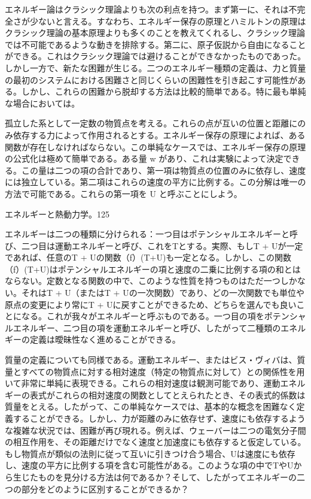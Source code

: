 \documentclass[a4paper,11pt,openany]{ltjsbook}
\begin{document}
エネルギー論はクラシック理論よりも次の利点を持つ。まず第一に、それは不完全さが少ないと言える。すなわち、エネルギー保存の原理とハミルトンの原理はクラシック理論の基本原理よりも多くのことを教えてくれるし、クラシック理論では不可能であるような動きを排除する。第二に、原子仮説から自由になることができる。これはクラシック理論では避けることができなかったものであった。しかし一方で、新たな困難が生じる。二つのエネルギー種類の定義は、力と質量の最初のシステムにおける困難さと同じくらいの困難性を引き起こす可能性がある。しかし、これらの困難から脱却する方法は比較的簡単である。特に最も単純な場合においては。

孤立した系として一定数の物質点を考える。これらの点が互いの位置と距離にのみ依存する力によって作用されるとする。エネルギー保存の原理によれば、ある関数が存在しなければならない。この単純なケースでは、エネルギー保存の原理の公式化は極めて簡単である。ある量 w があり、これは実験によって決定できる。この量は二つの項の合計であり、第一項は物質点の位置のみに依存し、速度には独立している。第二項はこれらの速度の平方に比例する。この分解は唯一の方法で可能である。これらの第一項を U と呼ぶことにしよう。

エネルギーと熱動力学。125

エネルギーは二つの種類に分けられる：一つ目はポテンシャルエネルギーと呼び、二つ目は運動エネルギーと呼び、これをTとする。実際、もしT + Uが一定であれば、任意のT + Uの関数（f）(T+U)も一定となる。しかし、この関数（f）(T+U)はポテンシャルエネルギーの項と速度の二乗に比例する項の和とはならない。定数となる関数の中で、このような性質を持つものはただ一つしかない。それはT + U（またはT + Uの一次関数）であり、どの一次関数でも単位や原点の変更により常にT + Uに戻すことができるため、どちらを選んでも良いことになる。これが我々がエネルギーと呼ぶものである。一つ目の項をポテンシャルエネルギー、二つ目の項を運動エネルギーと呼び、したがって二種類のエネルギーの定義は曖昧性なく進めることができる。

質量の定義についても同様である。運動エネルギー、またはビス・ヴィバは、質量とすべての物質点に対する相対速度（特定の物質点に対して）との関係性を用いて非常に単純に表現できる。これらの相対速度は観測可能であり、運動エネルギーの表式がこれらの相対速度の関数としてとえられたとき、その表式的係数は質量をとえる。したがって、この単純なケースでは、基本的な概念を困難なく定義することができる。しかし、力が距離のみに依存せず、速度にも依存するような複雑な状況では、困難が再び現れる。例えば、ウェーバーは二つの電気分子間の相互作用を、その距離だけでなく速度と加速度にも依存すると仮定している。もし物質点が類似の法則に従って互いに引きつけ合う場合、Uは速度にも依存し、速度の平方に比例する項を含む可能性がある。このような項の中でTやUから生じたものを見分ける方法は何であるか？そして、したがってエネルギーの二つの部分をどのように区別することができるか？
\end{document}
